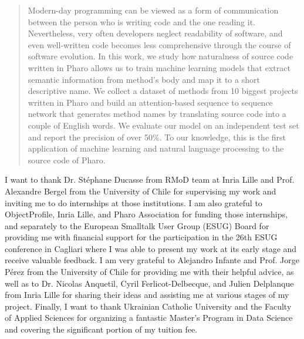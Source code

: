 \documentclass[
11pt, %
oneside, %
english, %
singlespacing, %
headsepline, %
]{MastersDoctoralThesis} %
\begin{document}

\begin{abstract}
\addchaptertocentry{\abstractname} %
Modern-day programming can be viewed as a form of communication between the person who is writing code and the one reading it. Nevertheless, very often developers neglect readability of software, and even well-written code becomes less comprehensive through the course of software evolution. In this work, we study how naturalness of source code written in Pharo allows us to train machine learning models that extract semantic information from method's body and map it to a short descriptive name. We collect a dataset of methods from 10 biggest projects written in Pharo and build an attention-based sequence to sequence network that generates method names by translating source code into a couple of English words. We evaluate our model on an independent test set and report the precision of over 50\%. To our knowledge, this is the first application of machine learning and natural language processing to the source code of Pharo.
\end{abstract}


\begin{acknowledgements}
\addchaptertocentry{\acknowledgementname} %
I want to thank Dr. Stéphane Ducasse from RMoD team at Inria Lille and Prof. Alexandre Bergel from the University of Chile for supervising my work and inviting me to do internships at those institutions. I am also grateful to ObjectProfile, Inria Lille, and Pharo Association for funding those internships, and separately to the European Smalltalk User Group (ESUG) Board for providing me with financial support for the participation in the 26th ESUG conference in Cagliari where I was able to present my work at its early stage and receive valuable feedback. I am very grateful to Alejandro Infante and Prof. Jorge Pérez from the University of Chile for providing me with their helpful advice, as well as to Dr. Nicolas Anquetil, Cyril Ferlicot-Delbecque, and Julien Delplanque from Inria Lille for sharing their ideas and assisting me at various stages of my project. Finally, I want to thank Ukrainian Catholic University and the Faculty of Applied Sciences for organizing a fantastic Master's Program in Data Science and covering the significant portion of my tuition fee.
\end{acknowledgements}
\end{document}
